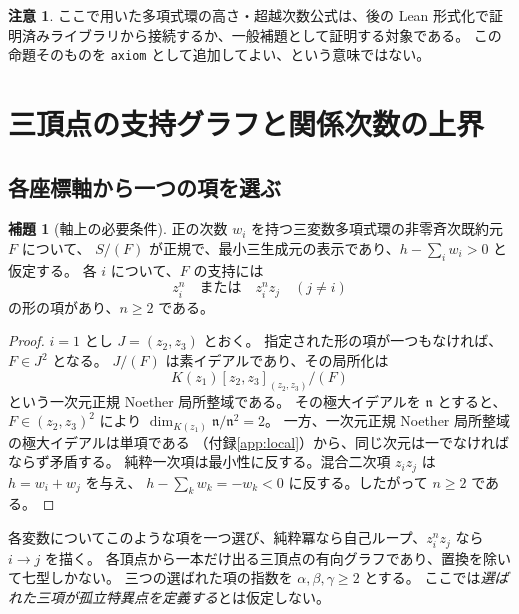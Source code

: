\documentclass[11pt,a4paper]{ltjsarticle}
\numberwithin{equation}{section}
\theoremstyle{definition}
\newtheorem{lemma}[theorem]{補題}
\newtheorem{remark}[theorem]{注意}
\begin{document}
\begin{remark}
ここで用いた多項式環の高さ・超越次数公式は、後の Lean 形式化で証明済みライブラリから接続するか、一般補題として証明する対象である。
この命題そのものを \texttt{axiom} として追加してよい、という意味ではない。
\end{remark}

\section{三頂点の支持グラフと関係次数の上界}\label{sec:support}
\subsection{各座標軸から一つの項を選ぶ}
\begin{lemma}[軸上の必要条件]\label{lem:axis}
正の次数 $w_i$ を持つ三変数多項式環の非零斉次既約元 $F$ について、
$S/(F)$ が正規で、最小三生成元の表示であり、$h-\sum_iw_i>0$ と仮定する。
各 $i$ について、$F$ の支持には
\[
 z_i^n\quad\text{または}\quad z_i^n z_j\quad(j\ne i)
\]
の形の項があり、$n\ge2$ である。
\end{lemma}
\begin{proof}
$i=1$ とし $J=(z_2,z_3)$ とおく。
指定された形の項が一つもなければ、$F\in J^2$ となる。
$J/(F)$ は素イデアルであり、その局所化は
\[
 K(z_1)[z_2,z_3]_{(z_2,z_3)}/(F)
\]
という一次元正規 Noether 局所整域である。
その極大イデアルを $\mathfrak n$ とすると、$F\in(z_2,z_3)^2$ により
$\dim_{K(z_1)}\mathfrak n/\mathfrak n^2=2$。
一方、一次元正規 Noether 局所整域の極大イデアルは単項である
（付録\ref{app:local}）から、同じ次元は一でなければならず矛盾する。
純粋一次項は最小性に反する。混合二次項 $z_i z_j$ は $h=w_i+w_j$ を与え、
$h-\sum_kw_k=-w_k<0$ に反する。したがって $n\ge2$ である。
\end{proof}
各変数についてこのような項を一つ選び、純粋冪なら自己ループ、$z_i^n z_j$ なら $i\to j$ を描く。
各頂点から一本だけ出る三頂点の有向グラフであり、置換を除いて七型しかない。
三つの選ばれた項の指数を $\alpha,\beta,\gamma\ge2$ とする。
ここでは\emph{選ばれた三項が孤立特異点を定義する}とは仮定しない。
\end{document}
